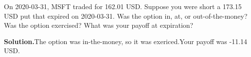 \noindent On 2020-03-31, MSFT traded for 162.01 USD. Suppose you were short a 173.15 USD put that expired on 2020-03-31. Was the option in, at, or out-of-the-money? Was the option exercised? What was your payoff at expiration?

\vspace{9pt} 

\textbf{Solution.}The option was in-the-money, so it was exericed.Your payoff was -11.14 USD.